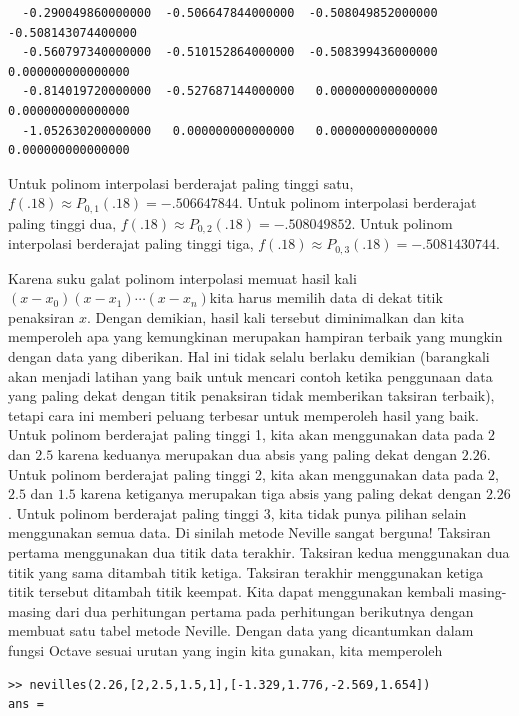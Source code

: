 \begin{description}
\begin{verbatim}
  -0.290049860000000  -0.506647844000000  -0.508049852000000  -0.508143074400000
  -0.560797340000000  -0.510152864000000  -0.508399436000000   0.000000000000000
  -0.814019720000000  -0.527687144000000   0.000000000000000   0.000000000000000
  -1.052630200000000   0.000000000000000   0.000000000000000   0.000000000000000
\end{verbatim} Untuk polinom interpolasi berderajat paling tinggi satu, $f(.18)\approx P_{0,1}(.18)=-.506647844$.
Untuk polinom interpolasi berderajat paling tinggi dua, $f(.18)\approx P_{0,2}(.18)=-.508049852$.
Untuk polinom interpolasi berderajat paling tinggi tiga, $f(.18)\approx P_{0,3}(.18)=-.5081430744$.
\item [{\ref{exc:interpolation-lagrange-11}:}] Karena suku galat polinom
interpolasi memuat hasil kali $(x-x_{0})(x-x_{1})\cdots(x-x_{n})$kita
harus memilih data di dekat titik penaksiran $x$. Dengan demikian,
hasil kali tersebut diminimalkan dan kita memperoleh apa yang kemungkinan
merupakan hampiran terbaik yang mungkin dengan data yang diberikan.
Hal ini tidak selalu berlaku demikian (barangkali akan menjadi latihan
yang baik untuk mencari contoh ketika penggunaan data yang paling
dekat dengan titik penaksiran tidak memberikan taksiran terbaik),
tetapi cara ini memberi peluang terbesar untuk memperoleh hasil yang
baik. Untuk polinom berderajat paling tinggi 1, kita akan menggunakan
data pada $2$ dan $2.5$ karena keduanya merupakan dua absis yang
paling dekat dengan $2.26$. Untuk polinom berderajat paling tinggi
2, kita akan menggunakan data pada $2$, $2.5$ dan $1.5$ karena
ketiganya merupakan tiga absis yang paling dekat dengan $2.26$. Untuk
polinom berderajat paling tinggi 3, kita tidak punya pilihan selain
menggunakan semua data. Di sinilah metode Neville sangat berguna!
Taksiran pertama menggunakan dua titik data terakhir. Taksiran kedua
menggunakan dua titik yang sama ditambah titik ketiga. Taksiran terakhir
menggunakan ketiga titik tersebut ditambah titik keempat. Kita dapat
menggunakan kembali masing-masing dari dua perhitungan pertama pada
perhitungan berikutnya dengan membuat satu tabel metode Neville. Dengan
data yang dicantumkan dalam fungsi Octave sesuai urutan yang ingin
kita gunakan, kita memperoleh \begin{verbatim}
>> nevilles(2.26,[2,2.5,1.5,1],[-1.329,1.776,-2.569,1.654])
ans =


\end{verbatim}
\end{description}
